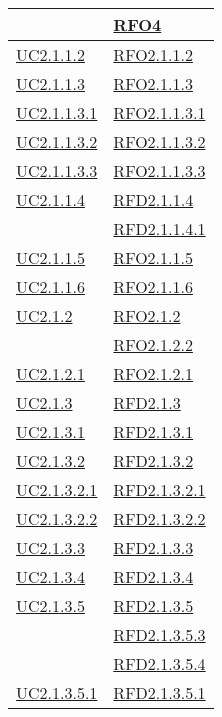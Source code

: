 \begin{longtable}{|>{\centering}m{5cm}|m{5cm}<{\centering}|}
& \hyperlink{RFO4}{RFO4}\\ \hline
\hyperref[UC2.1.1.2]{UC2.1.1.2} & \hyperlink{RFO2.1.1.2}{RFO2.1.1.2}\\ \hline
\hyperref[UC2.1.1.3]{UC2.1.1.3} & \hyperlink{RFO2.1.1.3}{RFO2.1.1.3}\\ \hline
\hyperref[UC2.1.1.3.1]{UC2.1.1.3.1} & \hyperlink{RFO2.1.1.3.1}{RFO2.1.1.3.1}\\ \hline
\hyperref[UC2.1.1.3.2]{UC2.1.1.3.2} & \hyperlink{RFO2.1.1.3.2}{RFO2.1.1.3.2}\\ \hline
\hyperref[UC2.1.1.3.3]{UC2.1.1.3.3} & \hyperlink{RFO2.1.1.3.3}{RFO2.1.1.3.3}\\ \hline
\hyperref[UC2.1.1.4]{UC2.1.1.4} & \hyperlink{RFD2.1.1.4}{RFD2.1.1.4}\\
& \hyperlink{RFD2.1.1.4.1}{RFD2.1.1.4.1}\\ \hline
\hyperref[UC2.1.1.5]{UC2.1.1.5} & \hyperlink{RFO2.1.1.5}{RFO2.1.1.5}\\ \hline
\hyperref[UC2.1.1.6]{UC2.1.1.6} & \hyperlink{RFO2.1.1.6}{RFO2.1.1.6}\\ \hline
\hyperref[UC2.1.2]{UC2.1.2} & \hyperlink{RFO2.1.2}{RFO2.1.2}\\
& \hyperlink{RFO2.1.2.2}{RFO2.1.2.2}\\ \hline
\hyperref[UC2.1.2.1]{UC2.1.2.1} & \hyperlink{RFO2.1.2.1}{RFO2.1.2.1}\\ \hline
\hyperref[UC2.1.3]{UC2.1.3} & \hyperlink{RFD2.1.3}{RFD2.1.3}\\ \hline
\hyperref[UC2.1.3.1]{UC2.1.3.1} & \hyperlink{RFD2.1.3.1}{RFD2.1.3.1}\\ \hline
\hyperref[UC2.1.3.2]{UC2.1.3.2} & \hyperlink{RFD2.1.3.2}{RFD2.1.3.2}\\ \hline
\hyperref[UC2.1.3.2.1]{UC2.1.3.2.1} & \hyperlink{RFD2.1.3.2.1}{RFD2.1.3.2.1}\\ \hline
\hyperref[UC2.1.3.2.2]{UC2.1.3.2.2} & \hyperlink{RFD2.1.3.2.2}{RFD2.1.3.2.2}\\ \hline
\hyperref[UC2.1.3.3]{UC2.1.3.3} & \hyperlink{RFD2.1.3.3}{RFD2.1.3.3}\\ \hline
\hyperref[UC2.1.3.4]{UC2.1.3.4} & \hyperlink{RFD2.1.3.4}{RFD2.1.3.4}\\ \hline
\hyperref[UC2.1.3.5]{UC2.1.3.5} & \hyperlink{RFD2.1.3.5}{RFD2.1.3.5}\\
& \hyperlink{RFD2.1.3.5.3}{RFD2.1.3.5.3}\\
& \hyperlink{RFD2.1.3.5.4}{RFD2.1.3.5.4}\\ \hline
\hyperref[UC2.1.3.5.1]{UC2.1.3.5.1} & \hyperlink{RFD2.1.3.5.1}{RFD2.1.3.5.1}\\ \hline

\end{longtable}
